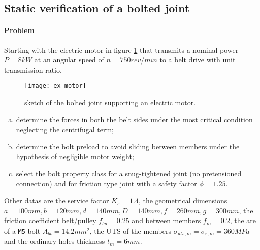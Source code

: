 \newpage
\subsection{Static verification of a bolted joint}
	
	\paragraph{Problem} Starting with the electric motor in figure \ref{ex:motorsketch} that transmits a nominal power $P = 8kW$ at an angular speed of $n = 750 rev/min$ to a belt drive with unit transmission ratio.
	\begin{figure}[b!]
		\centering\texttt{[image: ex-motor]}
		\caption{sketch of the bolted joint supporting an electric motor.} \label{ex:motorsketch}
	\end{figure}

	\begin{enumerate}[a)]
		\item determine the forces in both the belt sides under the most critical condition neglecting the centrifugal term;
		\item determine the bolt preload to avoid sliding between members under the hypothesis of negligible motor weight;
		\item select the bolt property class for a snug-tightened joint (no pretensioned connection) and for friction type joint with a safety factor $\phi = 1.25$.
	\end{enumerate}
	Other datas are the service factor $K_s = 1.4$, the geometrical dimensions $a = 100mm, b = 120mm, d = 140mm, D = 140mm, f=260mm, g = 300mm$, the friction coefficient belt/pulley $f_{bp} = 0.25$ and between members $f_m = 0.2$, the are of a \texttt{M5} bolt $A_{bt} = 14.2mm^2$, the UTS of the members $\sigma_{uts,m} = \sigma_{r,m} = 360MPa$ and the ordinary holes thickness $t_m = 6mm$.
	
